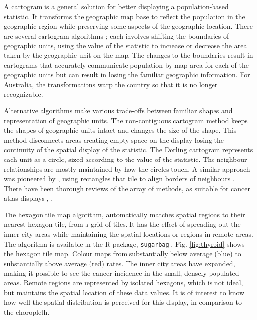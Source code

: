 \documentclass[times, doublespace]{anzsauth}
\begin{document}
A cartogram is a general solution for better displaying a
population-based statistic. It transforms the geographic map base to
reflect the population in the geographic region while preserving some
aspects of the geographic location. There are several cartogram
algorithms \citep{ACTUC, CBATCC}; each involves shifting the boundaries of
geographic units, using the value of the statistic to increase or
decrease the area taken by the geographic unit on the map. The changes
to the boundaries result in cartograms that accurately communicate
population by map area for each of the geographic units but can result
in losing the familiar geographic information. For Australia, the
transformations warp the country so that it is no longer recognizable.

Alternative algorithms make various trade-offs between familiar shapes
and representation of geographic units. The non-contiguous cartogram
method \citep{NAC} keeps the shapes of geographic units
intact and changes the size of the shape. This method disconnects areas
creating empty space on the display losing the continuity of the spatial
display of the statistic. The Dorling cartogram
\citep{ACTUC} represents each unit as a circle, sized
according to the value of the statistic. The neighbour relationships are
mostly maintained by how the circles touch. A similar approach was
pioneered by \cite{RSCW}, using rectangles that
tile to align borders of neighbours \citep{CDWCS}.
There have been thorough reviews of the array of methods, as suitable
for cancer atlas displays \citep{review},
\citep{BCM}.





The hexagon tile map algorithm, automatically matches spatial regions to
their nearest hexagon tile, from a grid of tiles. It has the effect of
spreading out the inner city areas while maintaining the spatial
locations or regions in remote areas. The algorithm is available in the
R package,  \texttt{sugarbag} \citep{sugarbag}. Fig.
\ref{fig:thyroid} shows the hexagon tile map. Colour maps from
substantially below average (blue) to substantially above average (red)
rates. The inner city areas have expanded, making it possible to see the
cancer incidence in the small, densely populated areas. Remote regions
are represented by isolated hexagons, which is not ideal, but maintains
the spatial location of these data values. It is of interest to know how
well the spatial distribution is perceived for this display, in
comparison to the choropleth.
\end{document}
